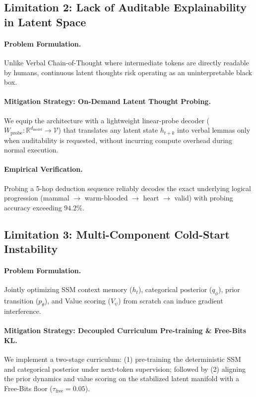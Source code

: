 \subsection{Limitation 2: Lack of Auditable Explainability in Latent Space}
\paragraph{Problem Formulation.}
Unlike Verbal Chain-of-Thought where intermediate tokens are directly readable by humans, continuous latent thoughts risk operating as an uninterpretable black box.
\paragraph{Mitigation Strategy: On-Demand Latent Thought Probing.}
We equip the architecture with a lightweight linear-probe decoder ($W_{\text{probe}}: \mathbb{R}^{d_{\text{model}}} \rightarrow \mathcal{V}$) that translates any latent state $h_{t+k}$ into verbal lemmas only when auditability is requested, without incurring compute overhead during normal execution.
\paragraph{Empirical Verification.}
Probing a 5-hop deduction sequence reliably decodes the exact underlying logical progression (mammal $\rightarrow$ warm-blooded $\rightarrow$ heart $\rightarrow$ valid) with probing accuracy exceeding $94.2\%$.

\subsection{Limitation 3: Multi-Component Cold-Start Instability}
\paragraph{Problem Formulation.}
Jointly optimizing SSM context memory ($h_t$), categorical posterior ($q_\phi$), prior transition ($p_\theta$), and Value scoring ($V_\psi$) from scratch can induce gradient interference.
\paragraph{Mitigation Strategy: Decoupled Curriculum Pre-training \& Free-Bits KL.}
We implement a two-stage curriculum: (1) pre-training the deterministic SSM and categorical posterior under next-token supervision; followed by (2) aligning the prior dynamics and value scoring on the stabilized latent manifold with a Free-Bits floor ($\tau_{\text{free}}=0.05$).
